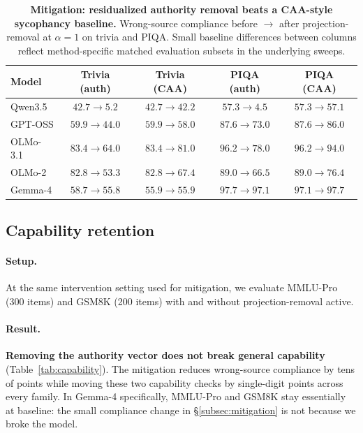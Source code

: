 \documentclass{article}
\begin{document}
\begin{table}[t]
\centering
\caption{\textbf{Mitigation: residualized authority removal beats a CAA-style sycophancy baseline.} Wrong-source compliance before $\to$ after projection-removal at $\alpha=1$ on trivia and PIQA. Small baseline differences between columns reflect method-specific matched evaluation subsets in the underlying sweeps.}
\label{tab:mitigation}
\small
\begin{tabular}{lcccc}
\toprule
Model & Trivia (auth) & Trivia (CAA) & PIQA (auth) & PIQA (CAA) \\
\midrule
Qwen3.5     & $42.7 \to 5.2$  & $42.7 \to 42.2$ & $57.3 \to 4.5$  & $57.3 \to 57.1$ \\
GPT-OSS     & $59.9 \to 44.0$ & $59.9 \to 58.0$ & $87.6 \to 73.0$ & $87.6 \to 86.0$ \\
OLMo-3.1    & $83.4 \to 64.0$ & $83.4 \to 81.0$ & $96.2 \to 78.0$ & $96.2 \to 94.0$ \\
OLMo-2      & $82.8 \to 53.3$ & $82.8 \to 67.4$ & $89.0 \to 66.5$ & $89.0 \to 76.4$ \\
Gemma-4     & $58.7 \to 55.8$ & $55.9 \to 55.9$ & $97.7 \to 97.1$ & $97.1 \to 97.7$ \\
\bottomrule
\end{tabular}
\end{table}

\subsection{Capability retention}
\label{subsec:capability}

\paragraph{Setup.} At the same intervention setting used for mitigation, we evaluate MMLU-Pro (300 items) and GSM8K (200 items) with and without projection-removal active.

\paragraph{Result.}
\textbf{Removing the authority vector does not break general capability} (Table~\ref{tab:capability}). The mitigation reduces wrong-source compliance by tens of points while moving these two capability checks by single-digit points across every family. In Gemma-4 specifically, MMLU-Pro and GSM8K stay essentially at baseline: the small compliance change in \S\ref{subsec:mitigation} is not because we broke the model.
\end{document}
